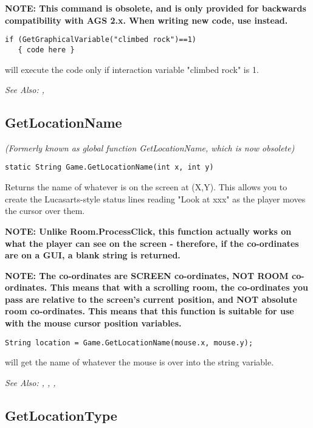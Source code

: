 \bf{NOTE:} This command is obsolete, and is only provided for backwards compatibility
with AGS 2.x. When writing new code, use 
instead.

\begin{verbatim}
if (GetGraphicalVariable("climbed rock")==1)
   { code here }
\end{verbatim}
will execute the code only if interaction variable "climbed rock" is 1.

\it{See Also:} , 


\subsection{GetLocationName}\label{Game.GetLocationName}%

\it{(Formerly known as global function GetLocationName, which is now obsolete)}

\begin{verbatim}
static String Game.GetLocationName(int x, int y)
\end{verbatim}
Returns the name of whatever is on the screen at (X,Y). This allows you to
create the Lucasarts-style status lines reading "Look at xxx" as the player
moves the cursor over them.

\bf{NOTE:} Unlike Room.ProcessClick, this function actually works on what the player can
see on the screen - therefore, if the co-ordinates are on a GUI, a blank string is returned.

\bf{NOTE:} The co-ordinates are SCREEN co-ordinates, NOT ROOM co-ordinates. This
means that with a scrolling room, the co-ordinates you pass are relative to
the screen's current position, and NOT absolute room co-ordinates. This
means that this function is suitable for use with the mouse cursor position
variables.

\begin{verbatim}
String location = Game.GetLocationName(mouse.x, mouse.y);
\end{verbatim}
will get the name of whatever the mouse is over into the string variable.

\it{See Also:} , ,
, 


\subsection{GetLocationType}\label{GetLocationType}%

